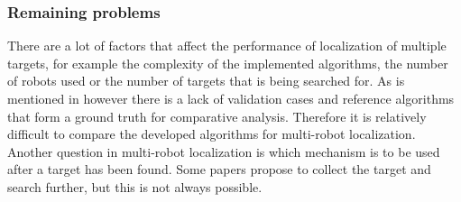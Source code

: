 	\subsubsection{Remaining problems}
	There are a lot of factors that affect the performance of localization of multiple targets, for example the complexity of the implemented algorithms, the number of robots used or the number of targets that is being searched for. As is mentioned in \cite{mcgill2011robot} however there is a lack of validation cases and reference algorithms that form a ground truth for comparative analysis. Therefore it is relatively difficult to compare the developed algorithms for multi-robot localization. Another question in multi-robot localization is which mechanism is to be used after a target has been found. Some papers propose to collect the target and search further, but this is not always possible.